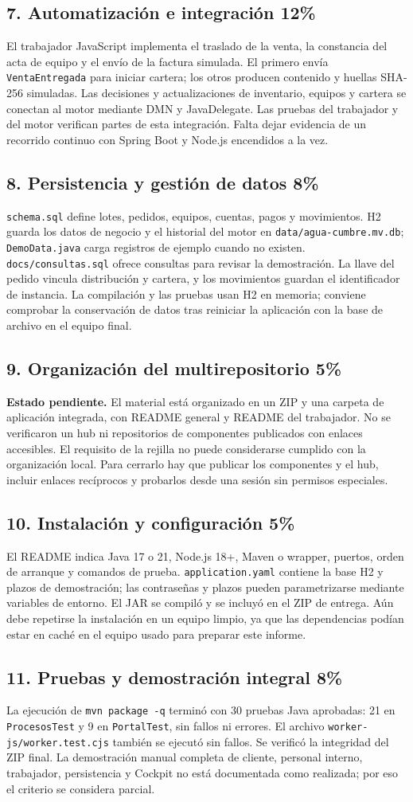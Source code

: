\documentclass[11pt,letterpaper]{article}
\newcommand{\ruta}[1]{\nolinkurl{#1}}
\newcommand{\criterio}[3]{\needspace{8\baselineskip}\subsection*{#1. #2 \hfill\normalsize\color{gris}#3}}
\begin{document}
\criterio{7}{Automatización e integración}{12\%}
El trabajador JavaScript implementa el traslado de la venta, la constancia del acta de equipo y el envío de la factura simulada. El primero envía \ruta{VentaEntregada} para iniciar cartera; los otros producen contenido y huellas SHA-256 simuladas. Las decisiones y actualizaciones de inventario, equipos y cartera se conectan al motor mediante DMN y JavaDelegate. Las pruebas del trabajador y del motor verifican partes de esta integración. Falta dejar evidencia de un recorrido continuo con Spring Boot y Node.js encendidos a la vez.

\criterio{8}{Persistencia y gestión de datos}{8\%}
\ruta{schema.sql} define lotes, pedidos, equipos, cuentas, pagos y movimientos. H2 guarda los datos de negocio y el historial del motor en \ruta{data/agua-cumbre.mv.db}; \ruta{DemoData.java} carga registros de ejemplo cuando no existen. \ruta{docs/consultas.sql} ofrece consultas para revisar la demostración. La llave del pedido vincula distribución y cartera, y los movimientos guardan el identificador de instancia. La compilación y las pruebas usan H2 en memoria; conviene comprobar la conservación de datos tras reiniciar la aplicación con la base de archivo en el equipo final.

\criterio{9}{Organización del multirepositorio}{5\%}
\textbf{Estado pendiente.} El material está organizado en un ZIP y una carpeta de aplicación integrada, con README general y README del trabajador. No se verificaron un hub ni repositorios de componentes publicados con enlaces accesibles. El requisito de la rejilla no puede considerarse cumplido con la organización local. Para cerrarlo hay que publicar los componentes y el hub, incluir enlaces recíprocos y probarlos desde una sesión sin permisos especiales.

\criterio{10}{Instalación y configuración}{5\%}
El README indica Java 17 o 21, Node.js 18+, Maven o wrapper, puertos, orden de arranque y comandos de prueba. \ruta{application.yaml} contiene la base H2 y plazos de demostración; las contraseñas y plazos pueden parametrizarse mediante variables de entorno. El JAR se compiló y se incluyó en el ZIP de entrega. Aún debe repetirse la instalación en un equipo limpio, ya que las dependencias podían estar en caché en el equipo usado para preparar este informe.

\criterio{11}{Pruebas y demostración integral}{8\%}
La ejecución de \texttt{mvn package -q} terminó con 30 pruebas Java aprobadas: 21 en \ruta{ProcesosTest} y 9 en \ruta{PortalTest}, sin fallos ni errores. El archivo \ruta{worker-js/worker.test.cjs} también se ejecutó sin fallos. Se verificó la integridad del ZIP final. La demostración manual completa de cliente, personal interno, trabajador, persistencia y Cockpit no está documentada como realizada; por eso el criterio se considera parcial.
\end{document}
